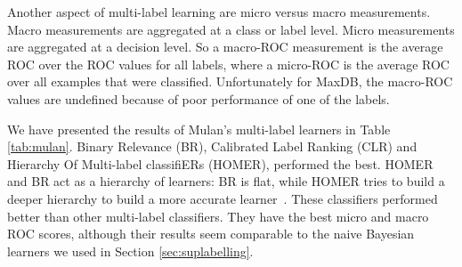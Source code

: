 \documentclass{acm_proc_article-sp}
\begin{document}
Another aspect of multi-label learning are micro versus macro measurements. Macro measurements are aggregated at a class or label level. Micro measurements are aggregated at a decision level. So a macro-ROC measurement is the average ROC over the ROC values for all labels, where a micro-ROC is the average ROC over all examples that were classified. Unfortunately for MaxDB, the macro-ROC values are undefined because of poor performance of one of the labels.

We have presented the results of Mulan's multi-label learners in Table \ref{tab:mulan}.  Binary Relevance (BR), Calibrated Label Ranking (CLR) and Hierarchy Of Multi-label classifiERs (HOMER), performed the best. HOMER and BR act as a hierarchy of learners: BR is flat, while HOMER tries to build a deeper hierarchy to build a more accurate learner~\cite{mulan}. These classifiers performed better than other multi-label classifiers. They have the best micro and macro ROC scores, although their results seem comparable to the naive Bayesian learners we used in Section \ref{sec:suplabelling}.
\end{document}
